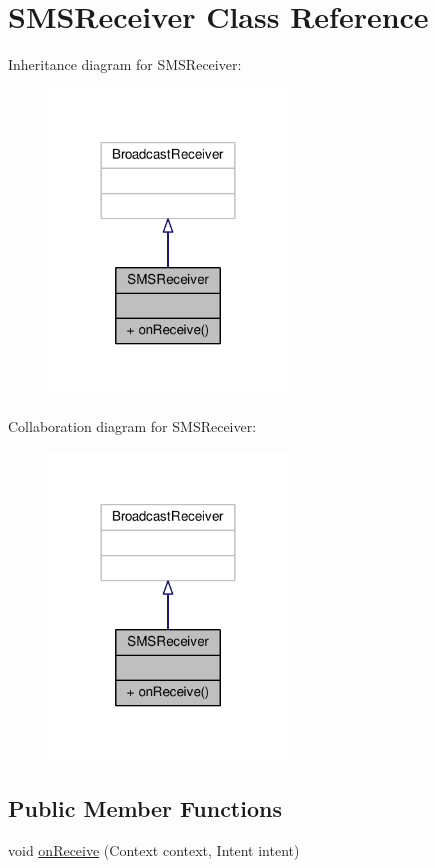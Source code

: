 \hypertarget{a00015}{\section{S\+M\+S\+Receiver Class Reference}
\label{a00015}
}


Inheritance diagram for S\+M\+S\+Receiver\+:
\nopagebreak
\begin{figure}[H]
\begin{center}
\leavevmode
\includegraphics[width=180pt]{a00049}
\end{center}
\end{figure}


Collaboration diagram for S\+M\+S\+Receiver\+:
\nopagebreak
\begin{figure}[H]
\begin{center}
\leavevmode
\includegraphics[width=180pt]{a00050}
\end{center}
\end{figure}
\subsection*{Public Member Functions}
\begin{DoxyCompactItemize}
\item 
void \hyperlink{a00015_afe2ab6137f59f9ff640f1e3b74080ad7}{on\+Receive} (Context context, Intent intent)
\end{DoxyCompactItemize}


